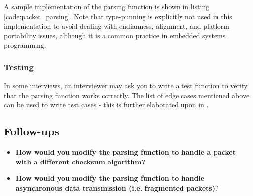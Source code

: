 \documentclass[main.tex]{subfiles}
\begin{document}
\noindent A sample implementation of the parsing function is shown in listing \ref{code:packet_parsing}. Note that type-punning is explicitly not used in this implementation to avoid dealing with endianness, alignment, and platform portability issues, although it is a common practice in embedded systems programming.



\subsubsection{Testing}
In some interviews, an interviewer may ask you to write a test function to verify that the parsing function works correctly. The list of edge cases mentioned above can be used to write test cases - this is further elaborated upon in .

\subsection{Follow-ups}
\begin{itemize}
    \item \textbf{How would you modify the parsing function to handle a packet with a different checksum algorithm?}
    \item \textbf{How would you modify the parsing function to handle asynchronous data transmission (i.e. fragmented packets)}?
\end{itemize}
\end{document}
